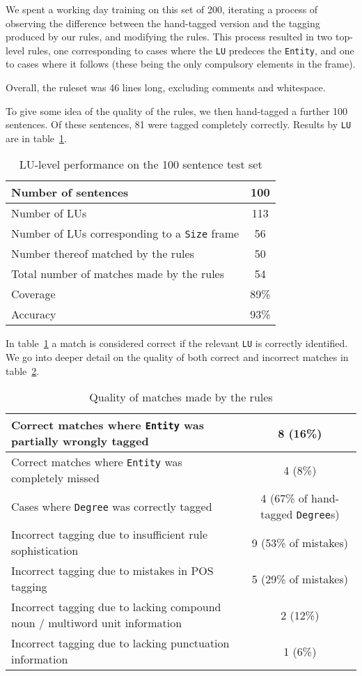 \documentclass{llncs}
\begin{document}
We spent a working day training on this set of 200, iterating a process
of observing the difference between the hand-tagged version and the
tagging produced by our rules, and modifying the rules. This process resulted
in two top-level rules, one corresponding to cases where the \verb+LU+ predeces
the \verb+Entity+, and one to cases where it follows (these being the only
compulsory elements in the frame).

Overall, the ruleset was 46 lines long, excluding comments and whitespace.

To give some idea of the quality of the rules, we then hand-tagged a further 100 sentences.
Of these sentences, 81 were tagged completely correctly. Results by \verb+LU+ are in
table~\ref{luperf}.

\begin{table}[h]
  \centering
  \begin{tabular}{|l|c|}
    \hline
    Number of sentences & 100 \\
    \hline
    Number of LUs & 113 \\
    \hline
    Number of LUs corresponding to a \verb+Size+ frame & 56 \\ %
    \hline
    Number thereof matched by the rules & 50 \\
    \hline
    Total number of matches made by the rules & 54 \\
    \hline
    Coverage & 89\% \\
    \hline
    Accuracy & 93\% \\
    \hline
  \end{tabular}
  \caption{LU-level performance on the 100 sentence test set}
  \label{luperf}
\end{table}

In table~\ref{luperf} a match is considered correct if the relevant \verb+LU+
is correctly identified. We go into deeper detail on the quality of both
correct and incorrect matches in table~\ref{framequality}.

\begin{table}[h]
  \centering
  \begin{tabular}{|l|c|}
    \hline
    Correct matches where \verb+Entity+ was partially wrongly tagged & 8 (16\%) \\
    \hline
    Correct matches where \verb+Entity+ was completely missed & 4 (8\%) \\
    \hline
    Cases where \verb+Degree+ was correctly tagged & 4 (67\% of hand-tagged \verb+Degree+s) \\
    \hline
    Incorrect tagging due to insufficient rule sophistication & 9 (53\% of mistakes) \\
    \hline
    Incorrect tagging due to mistakes in POS tagging & 5 (29\% of mistakes) \\
    \hline
    Incorrect tagging due to lacking compound noun / multiword unit information & 2 (12\%) \\
    \hline
    Incorrect tagging due to lacking punctuation information & 1 (6\%) \\
    \hline
  \end{tabular}
  \caption{Quality of matches made by the rules}
  \label{framequality}
\end{table}
\end{document}
